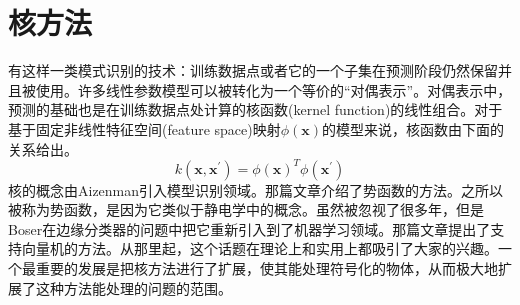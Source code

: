 \section{核方法}
有这样一类模式识别的技术：训练数据点或者它的一个子集在预测阶段仍然保留并且被使用。许多线性参数模型可以被转化为一个等价的“对偶表示”。对偶表示中，预测的基础也是在训练数据点处计算的核函数(kernel function)的线性组合。对于基于固定非线性特征空间(feature space)映射$\phi(\boldsymbol{x})$的模型来说，核函数由下面的关系给出。
\begin{equation}
\label{kernel}
	k(\boldsymbol{x},\boldsymbol{x}^{'})=\phi(\boldsymbol{x})^T\phi(\boldsymbol{x}^{'})
\end{equation}
核的概念由Aizenman引入模型识别领域。那篇文章介绍了势函数的方法。之所以被称为势函数，是因为它类似于静电学中的概念。虽然被忽视了很多年，但是Boser在边缘分类器的问题中把它重新引入到了机器学习领域。那篇文章提出了支持向量机的方法。从那里起，这个话题在理论上和实用上都吸引了大家的兴趣。一个最重要的发展是把核方法进行了扩展，使其能处理符号化的物体，从而极大地扩展了这种方法能处理的问题的范围。